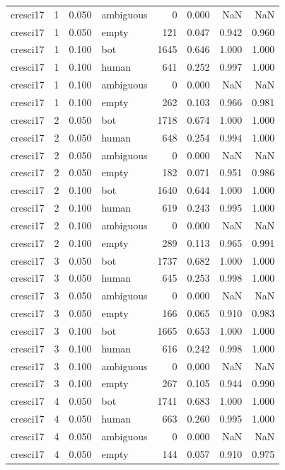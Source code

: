 \begin{tabular}{lrrlrrrr}
cresci17 & 1 & 0.050 & ambiguous & 0 & 0.000 & NaN & NaN \\
cresci17 & 1 & 0.050 & empty & 121 & 0.047 & 0.942 & 0.960 \\
cresci17 & 1 & 0.100 & bot & 1645 & 0.646 & 1.000 & 1.000 \\
cresci17 & 1 & 0.100 & human & 641 & 0.252 & 0.997 & 1.000 \\
cresci17 & 1 & 0.100 & ambiguous & 0 & 0.000 & NaN & NaN \\
cresci17 & 1 & 0.100 & empty & 262 & 0.103 & 0.966 & 0.981 \\
cresci17 & 2 & 0.050 & bot & 1718 & 0.674 & 1.000 & 1.000 \\
cresci17 & 2 & 0.050 & human & 648 & 0.254 & 0.994 & 1.000 \\
cresci17 & 2 & 0.050 & ambiguous & 0 & 0.000 & NaN & NaN \\
cresci17 & 2 & 0.050 & empty & 182 & 0.071 & 0.951 & 0.986 \\
cresci17 & 2 & 0.100 & bot & 1640 & 0.644 & 1.000 & 1.000 \\
cresci17 & 2 & 0.100 & human & 619 & 0.243 & 0.995 & 1.000 \\
cresci17 & 2 & 0.100 & ambiguous & 0 & 0.000 & NaN & NaN \\
cresci17 & 2 & 0.100 & empty & 289 & 0.113 & 0.965 & 0.991 \\
cresci17 & 3 & 0.050 & bot & 1737 & 0.682 & 1.000 & 1.000 \\
cresci17 & 3 & 0.050 & human & 645 & 0.253 & 0.998 & 1.000 \\
cresci17 & 3 & 0.050 & ambiguous & 0 & 0.000 & NaN & NaN \\
cresci17 & 3 & 0.050 & empty & 166 & 0.065 & 0.910 & 0.983 \\
cresci17 & 3 & 0.100 & bot & 1665 & 0.653 & 1.000 & 1.000 \\
cresci17 & 3 & 0.100 & human & 616 & 0.242 & 0.998 & 1.000 \\
cresci17 & 3 & 0.100 & ambiguous & 0 & 0.000 & NaN & NaN \\
cresci17 & 3 & 0.100 & empty & 267 & 0.105 & 0.944 & 0.990 \\
cresci17 & 4 & 0.050 & bot & 1741 & 0.683 & 1.000 & 1.000 \\
cresci17 & 4 & 0.050 & human & 663 & 0.260 & 0.995 & 1.000 \\
cresci17 & 4 & 0.050 & ambiguous & 0 & 0.000 & NaN & NaN \\
cresci17 & 4 & 0.050 & empty & 144 & 0.057 & 0.910 & 0.975 \\

\end{tabular}
